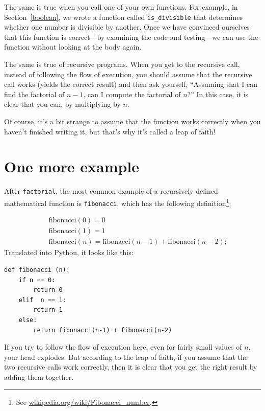 \documentclass[10pt]{book}
\begin{document}
The same is true when you call one of your own functions.  For
example, in Section~\ref{boolean}, we wrote a function called 
\verb"is_divisible" that determines whether one number is divisible by
another.  Once we have convinced ourselves that this function is
correct---by examining the code and testing---we can use the function
without looking at the body again.


The same is true of recursive programs.  When you get to the recursive
call, instead of following the flow of execution, you should assume
that the recursive call works (yields the correct result) and then ask
yourself, ``Assuming that I can find the factorial of $n-1$, can I
compute the factorial of $n$?''  In this case, it is clear that you
can, by multiplying by $n$.

Of course, it's a bit strange to assume that the function works
correctly when you haven't finished writing it, but that's why
it's called a leap of faith!


\section{One more example}
\label{one more example}


After {\tt factorial}, the most common example of a recursively
defined mathematical function is {\tt fibonacci}, which has the
following definition\footnote{See
  \url{wikipedia.org/wiki/Fibonacci_number}.}:

\vspace{-0.25in}
\begin{eqnarray*}
&& \mathrm{fibonacci}(0) = 0 \\
&& \mathrm{fibonacci}(1) = 1 \\
&& \mathrm{fibonacci}(n) = \mathrm{fibonacci}(n-1) + \mathrm{fibonacci}(n-2);
\end{eqnarray*}
%
Translated into Python, it looks like this:

\beforeverb
\begin{verbatim}
def fibonacci (n):
    if n == 0:
        return 0
    elif  n == 1:
        return 1
    else:
        return fibonacci(n-1) + fibonacci(n-2)
\end{verbatim}
\afterverb
%
If you try to follow the flow of execution here, even for fairly
small values of $n$, your head explodes.  But according to the
leap of faith, if you assume that the two recursive calls
work correctly, then it is clear that you get
the right result by adding them together.
\end{document}
